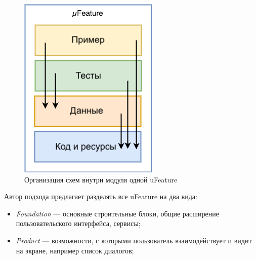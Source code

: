 \begin{figure}[h]
  \centering
    \includegraphics{inc/img/ufeature-diagram.png}
  \caption{Организация схем внутри модуля одной uFeature}
  \label{sec:analysis:research:mobArch:ufeature:featureDependencyDiagram}
\end{figure}

Автор подхода предлагает разделять все uFeature на два вида:

\begin{itemize}
	\item \emph{Foundation} --- основные строительные блоки, общие расширение пользовательского интерфейса, сервисы;
	\item \emph{Product} --- возможности, с которыми пользователь взаимодействует и видит на экране, например список диалогов;
\end{itemize}

